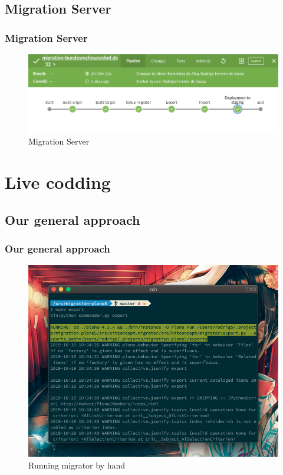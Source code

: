 \documentclass[aspectratio=169]{beamer}
\begin{document}
\subsection{Migration Server}
\begin{frame}
  \frametitle{Migration Server}
  \begin{figure}
    \includegraphics[width=\textwidth]{./img/008_-_Migration.png}
    \caption{Migration Server}
  \end{figure}
\end{frame}

\section{Live codding}
\subsection{Our general approach}
\begin{frame}
  \frametitle{Our general approach}
  \begin{figure}
    \includegraphics[height=.7\textheight]{./img/009_-_our_way.png}
    \caption{Running migrator by hand} \end{figure}
\end{frame}
\end{document}
